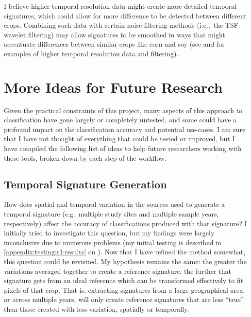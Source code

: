 I believe higher temporal resolution data might create more detailed temporal signatures, which could allow for more difference to be detected between different crops. Combining such data with certain noise-filtering methods (i.e.,\ the TSF wavelet filtering) may allow signatures to be smoothed in ways that might accentuate differences between similar crops like corn and soy (see \textcite{doraiswamy2006improved} and \textcite{sakamoto2010a-two-step} for examples of higher temporal resolution data and filtering).


\section{More Ideas for Future Research}

Given the practical constraints of this project, many aspects of this approach to classification have gone largely or completely untested, and some could have a profound impact on the classification accuracy and potential use-cases. I am sure that I have not thought of everything that could be tested or improved, but I have compiled the following list of ideas to help future researchers working with these tools, broken down by each step of the workflow.

\subsection{Temporal Signature Generation}

How does spatial and temporal variation in the sources used to generate a temporal signature (e.g.\ multiple study sites and multiple sample years, respectively) affect the accuracy of classifications produced with that signature? I initially tried to investigate this question, but my findings were largely inconclusive due to numerous problems (my initial testing is described in \autoref{appendix:testing:r1:results} on ). Now that I have refined the method somewhat, this question could be revisited. My hypothesis remains the same: the greater the variations averaged together to create a reference signature, the further that signature gets from an ideal reference which can be transformed effectively to fit pixels of that crop. That is, extracting signatures from a large geographical area, or across multiple years, will only create reference signatures that are less ``true'' than those created with less variation, spatially or temporally.

